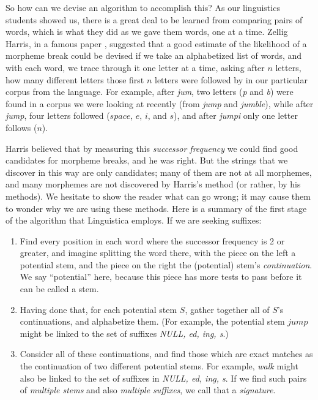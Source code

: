 \documentclass[output=paper,colorlinks,citecolor=brown]{langscibook}
\begin{document}
So how can we devise an algorithm to accomplish this? As our linguistics students showed us, there is a great deal to be learned from comparing pairs of words, which is what they did as we gave them words, one at a time. Zellig Harris, in a famous paper \citep{Harris1955}, suggested that a good estimate of the likelihood of a morpheme break could be devised if we take an alphabetized list of words, and with each word, we trace through it one letter at a time, asking after $n$ letters, how many different letters  those first $n$ letters were followed by in our particular corpus from the language. For example, after \textit{jum}, two letters (\textit{p} and \textit{b}) were found in a corpus we were looking at recently (from \textit{jump} and \textit{jumble}), while after \textit{jump}, four letters followed ($space$, $e$, $i$, and $s$), and after \textit{jumpi} only one letter follows ($n$).

Harris believed that by measuring this \textit{successor frequency} we could find good candidates for morpheme breaks, and he was right. But the strings that we discover in this way are only candidates; many of them are not at all morphemes, and many morphemes are not discovered by Harris's method (or rather, by his methods). We hesitate to show the reader what can go wrong; it may cause them to wonder why we are using these methods. Here is a summary of the first stage of the algorithm that Linguistica employs. If we are seeking suffixes:
\begin{enumerate}
\item  Find every position in each word where the successor frequency is 2 or greater, and imagine splitting the word there, with the piece on the left a potential stem, and the piece on the right the (potential) stem's \textit{continuation}. We say ``potential'' here, because this piece has more tests to pass before it can be called a stem.

\item  Having done that, for each potential stem $S$, gather together all of $S$'s continuations, and alphabetize them. (For example, the potential stem $jump$ might be linked to the set of suffixes \textit{NULL, ed, ing, s}.) 

\item   Consider all of these continuations, and find those which are exact matches as the continuation of two different potential stems. For example, \textit{walk} might also be linked to the set of suffixes in \textit{NULL, ed, ing, s}. If we find such pairs of \textit{multiple stems} and also \textit{multiple suffixes}, we call that a \textit{signature}.
\end{enumerate}
\end{document}
